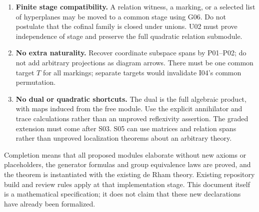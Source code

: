 \documentclass[11pt]{article}
\theoremstyle{remark}\newtheorem{remark}[theorem]{Remark}
\begin{document}
\begin{enumerate}
coverage of complements without rational points must be retained.
\item \textbf{Finite stage compatibility.} A relation witness,
a marking, or a selected list of hyperplanes may be moved to a
common stage using G06. Do not postulate that the cofinal
family is closed under unions. U02 must prove independence of
stage and preserve the full quadratic relation submodule.
\item \textbf{No extra naturality.} Recover coordinate subspace
spans by P01--P02; do not add arbitrary projections as diagram
arrows. There must be one common target $T$ for all markings;
separate targets would invalidate I04's common permutation.
\item \textbf{No dual or quadratic shortcuts.} The dual is the
full algebraic product, with maps induced from the free module.
Use the explicit annihilator and trace calculations rather than
an unproved reflexivity assertion. The graded extension must
come after S03. S05 can use matrices and relation spans rather
than unproved localization theorems about an arbitrary theory.
\end{enumerate}

Completion means that all proposed modules elaborate without
new axioms or placeholders, the generator formulas and group
equivalence laws are proved, and the theorem is instantiated
with the existing de Rham theory. Existing repository build and
review rules apply at that implementation stage. This document
itself is a mathematical specification; it does not
claim that these new declarations have already been formalized.
\end{document}
